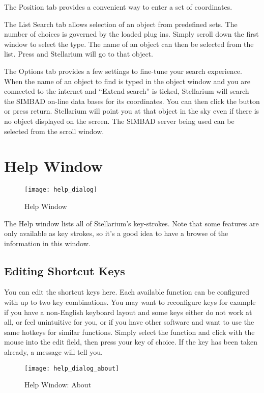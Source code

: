The Position tab provides a convenient way to enter a set
of coordinates.


The List Search tab allows selection of an object from predefined
sets.  The number of choices is governed by the loaded plug
ins. Simply scroll down the first window to select the type. The name
of an object can then be selected from the list. Press \key{\return} and
Stellarium will go to that object.


The Options tab provides a few settings to fine-tune your search experience.
When the name of an object to find is typed in the object
window and you are connected to the internet and ``Extend search'' is
ticked, Stellarium will search the SIMBAD on-line  data bases for its
coordinates. You can then click the  button or press return.
Stellarium will point you at that object in the sky even if there is no
object displayed on the screen. The SIMBAD server being used can be
selected from the scroll window.


\section{Help Window}
\label{sec:gui:help}

\begin{figure}[htbp]
\centering\texttt{[image: help\_dialog]}
\caption{Help Window}
\label{fig:gui:help}
\end{figure}

\noindent The Help window lists all of Stellarium's key-strokes. Note that some
features are only available as key strokes, so it's a good idea to have
a browse of the information in this window.

\subsection{Editing Shortcut Keys}
\label{sec:gui:help:hotkeys}

You can edit the shortcut keys here. Each available function can be
configured with up to two key combinations. You may want to
reconfigure keys for example if you have a non-English keyboard layout
and some keys either do not work at all, or feel unintuitive for you,
or if you have other software and want to use the same hotkeys for
similar functions. Simply select the function and click with the mouse
into the edit field, then press your key of choice. If the key has
been taken already, a message will tell you.


\begin{figure}[htbp]
\centering\texttt{[image: help\_dialog\_about]}
\caption{Help Window: About}
\label{fig:gui:help:about}
\end{figure}

